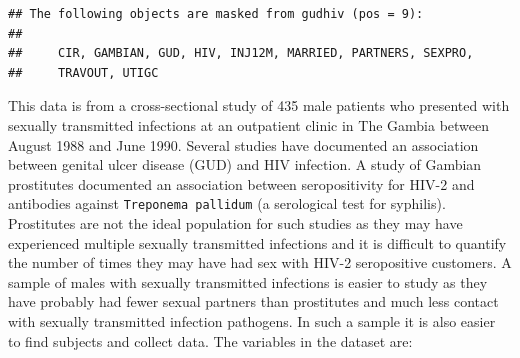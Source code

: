 \documentclass[]{book}
\theoremstyle{definition}
\theoremstyle{definition}
\theoremstyle{definition}
\theoremstyle{remark}
\begin{document}
\begin{verbatim}
## The following objects are masked from gudhiv (pos = 9):
## 
##     CIR, GAMBIAN, GUD, HIV, INJ12M, MARRIED, PARTNERS, SEXPRO,
##     TRAVOUT, UTIGC
\end{verbatim}

This data is from a cross-sectional study of 435 male patients who
presented with sexually transmitted infections at an outpatient clinic
in The Gambia between August 1988 and June 1990. Several studies have
documented an association between genital ulcer disease (GUD) and HIV
infection. A study of Gambian prostitutes documented an association
between seropositivity for HIV-2 and antibodies against
\texttt{Treponema\ pallidum} (a serological test for syphilis).
Prostitutes are not the ideal population for such studies as they may
have experienced multiple sexually transmitted infections and it is
difficult to quantify the number of times they may have had sex with
HIV-2 seropositive customers. A sample of males with sexually
transmitted infections is easier to study as they have probably had
fewer sexual partners than prostitutes and much less contact with
sexually transmitted infection pathogens. In such a sample it is also
easier to find subjects and collect data. The variables in the dataset
are:
\end{document}
